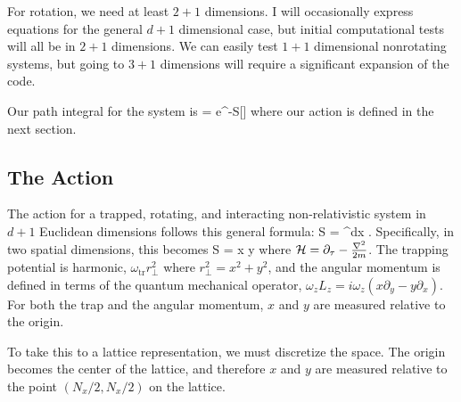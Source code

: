 \documentclass[../../RotatingBosons.tex]{subfiles}
\begin{document}
For rotation, we need at least $2+1$ dimensions. I will occasionally express equations for the general $d+1$ dimensional case, but initial computational tests will all be in $2+1$ dimensions. We can easily test $1+1$ dimensional nonrotating systems, but going to $3+1$ dimensions will require a significant expansion of the code.

Our path integral for the system is 
%
\beq
\CZ = \int \CD \phi e^{-S[\phi]}
\eeq
%
where our action is defined in the next section.
\subsection{The Action}
The action for a trapped, rotating, and interacting non-relativistic system in $d+1$ Euclidean dimensions follows this general formula:
%
\beq
S = \int \dif^{d}x \dif\tau {}.
\eeq 
%
Specifically, in two spatial dimensions, this becomes
%
\beq
S = \int \dif x \dif y \dif \tau {}
\eeq 
%
where ${\mathcal H} = \partial_{\tau} - \frac{{\nabla}^{2}}{2m} $. The trapping potential is harmonic, $\omega_{\mathrm{tr}}r_{\perp}^{2}$ where $r_{\perp}^{2} = x^{2} + y^{2}$, and the angular momentum is defined in terms of the quantum mechanical operator, $\omega_{z}L_{z} = i \omega_{z}(x \partial_{y} - y\partial_{x})$. For both the trap and the angular momentum, $x$ and $y$ are measured relative to the origin.

To take this to a lattice representation, we must discretize the space. The origin becomes the center of the lattice, and therefore $x$ and $y$ are measured relative to the point $(N_{x}/2, N_{x}/2)$ on the lattice.
\end{document}
